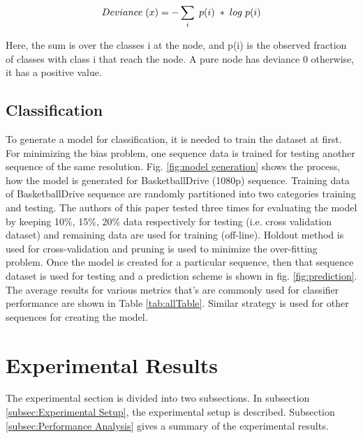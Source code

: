 \documentclass{article}
\begin{document}
\begin{equation}
\label{eqn_example:IG}
Deviance\hspace{0.1cm}(x) = - \sum\limits_{i} \hspace{0.1cm} p(i)\hspace{0.1cm}*\hspace{0.1cm}log \hspace{0.1cm}p(i)
\vspace{-0.1mm}
\end{equation}

Here, the sum is over the classes i at the node, and p(i) is the observed fraction of classes with class i that reach the node. A pure node has deviance 0 otherwise, it has a positive value.


\subsection{Classification}
\label{subsec:Classification}

To generate a model for classification, it is needed to train the dataset at first. For minimizing the bias problem, one sequence data is trained for testing another sequence of the same resolution. Fig. \ref{fig:model generation} shows the process, how the model is generated for BasketballDrive (1080p) sequence. Training data of BasketballDrive sequence are randomly partitioned into two categories training and testing. The authors of this paper tested three times for evaluating the model by keeping 10\%, 15\%, 20\% data respectively  for testing (i.e. cross validation dataset) and remaining data are used for training (off-line). Holdout method is used for cross-validation and pruning is used to minimize the over-fitting problem. Once the model is created for a particular sequence, then that sequence dataset is used for testing and a prediction scheme is shown in fig. \ref{fig:prediction}. The average results for various metrics that's are commonly used for classifier performance are shown in Table \ref{tab:allTable}. Similar strategy is used for other sequences for creating the model.
 

\section{Experimental Results}
\label{sec:Experimental Analysis}

The experimental section is divided into two subsections. In subsection \ref{subsec:Experimental Setup}, the experimental setup is described. Subsection \ref{subsec:Performance Analysis} gives a summary of the experimental results.
\end{document}
